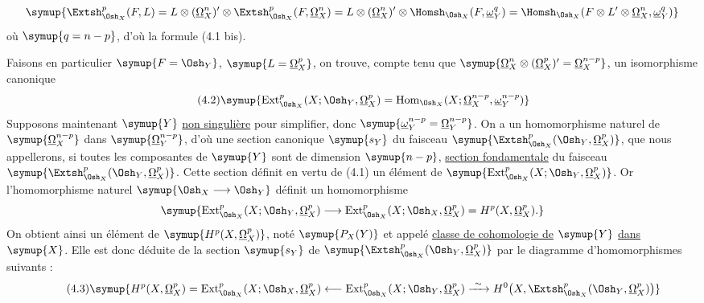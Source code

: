 \[
\symup{\Extsh_{\Osh_X}^{p}(F,L)
=L\otimes(\underline{\Omega}_X^{n})'\otimes
  \Extsh_{\Osh_X}^{p}(F,\underline{\Omega}_X^{n})
=L\otimes(\underline{\Omega}_X^{n})'\otimes
  \Homsh_{\Osh_X}(F,\underline{\omega}_Y^{q})
=\Homsh_{\Osh_X}\!\left(
  F\otimes L'\otimes\underline{\Omega}_X^{n},\underline{\omega}_Y^{q}\right)}
\]
où $\symup{q=n-p}$, d'où la formule (4.1 bis).

Faisons en particulier $\symup{F=\Osh_Y}$, $\symup{L=\underline{\Omega}_X^{p}}$, on trouve, compte tenu
que $\symup{\underline{\Omega}_X^{n}\otimes(\underline{\Omega}_X^{p})'=\underline{\Omega}_X^{n-p}}$, un isomorphisme
canonique
\begin{equation}\tag{4.2}
  \symup{\operatorname{Ext}_{\Osh_X}^{p}(X;\Osh_Y,\underline{\Omega}_X^{p})
  =\operatorname{Hom}_{\Osh_X}
  (X;\underline{\Omega}_X^{n-p},\underline{\omega}_Y^{n-p})}
\end{equation}
Supposons maintenant $\symup{Y}$ \uline{non singulière} pour simplifier, donc
$\symup{\underline{\omega}_Y^{n-p}=\underline{\Omega}_Y^{n-p}}$. On a un homomorphisme naturel de
$\symup{\underline{\Omega}_X^{n-p}}$ dans $\symup{\underline{\Omega}_Y^{n-p}}$, d'où une section canonique $\symup{s_Y}$ du
faisceau $\symup{\Extsh_{\Osh_X}^{p}(\Osh_Y,\underline{\Omega}_X^{p})}$, que nous appellerons, si
toutes les composantes de $\symup{Y}$ sont de dimension $\symup{n-p}$, \uline{section
fondamentale} du faisceau $\symup{\Extsh_{\Osh_X}^{p}(\Osh_Y,\underline{\Omega}_X^{p})}$. Cette
section définit en vertu de (4.1) un élément de
$\symup{\operatorname{Ext}_{\Osh_X}^{p}(X;\Osh_Y,\underline{\Omega}_X^{p})}$. Or l'homomorphisme
naturel $\symup{\Osh_X\longrightarrow\Osh_Y}$ définit un homomorphisme
\[
  \symup{\operatorname{Ext}_{\Osh_X}^{p}(X;\Osh_Y,\underline{\Omega}_X^{p})
  \longrightarrow
  \operatorname{Ext}_{\Osh_X}^{p}(X;\Osh_X,\underline{\Omega}_X^{p})
  =H^{p}(X,\underline{\Omega}_X^{p}).}
\]
On obtient ainsi un élément de $\symup{H^{p}(X,\underline{\Omega}_X^{p})}$, noté $\symup{P_X(Y)}$ et appelé
\uline{classe de cohomologie de} $\symup{Y}$ \uline{dans} $\symup{X}$. Elle est donc déduite de la section
$\symup{s_Y}$ de $\symup{\Extsh_{\Osh_X}^{p}(\Osh_Y,\underline{\Omega}_X^{p})}$ par le diagramme
d'homomorphismes suivants :
\begin{equation}\tag{4.3}
\symup{H^{p}(X,\underline{\Omega}_X^{p})
=\operatorname{Ext}_{\Osh_X}^{p}(X;\Osh_X,\underline{\Omega}_X^{p})
\longleftarrow\operatorname{Ext}_{\Osh_X}^{p}(X;\Osh_Y,\underline{\Omega}_X^{p})
\xrightarrow{\ \sim\ }
H^{0}\!\left(X,\Extsh_{\Osh_X}^{p}(\Osh_Y,\underline{\Omega}_X^{p})\right)}
\end{equation}

